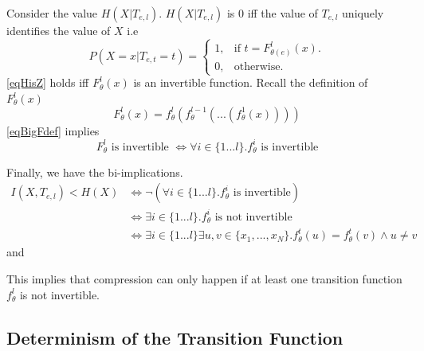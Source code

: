 \documentclass[dissertation.tex]{subfiles}
\begin{document}
Consider the value $H(X|T_{e,l})$. $H(X|T_{e,l})$ is 0 iff the value of
$T_{e,l}$ uniquely identifies the value of $X$ i.e
\begin{equation} 
  P(X=x|T_{e,t}=t) = \begin{cases}
    1, & \text{if } t = F_{\theta(e)}^l(x). \\
    0, & \text{otherwise}.
  \end{cases}
  \label{eqHisZ}
\end{equation}
\autoref{eqHisZ} holds iff $F_{\theta}^l(x)$ is an invertible function.
Recall the definition of $F_{\theta}^l(x)$
\begin{equation}
  F_{\theta}^l(x) = f_{\theta}^l(f_{\theta}^{l-1}(...(f_{\theta}^1(x))))
  \label{eqBigFdef}
\end{equation}
\autoref{eqBigFdef} implies 
\begin{equation*}
  F_\theta^l \text{ is invertible } 
  \Leftrightarrow 
  \forall{i}\in{\{1...l\}}. f_\theta^i \text{ is invertible} 
\end{equation*}

Finally, we have the bi-implications.
\begin{align}
  I(X, T_{e,l}) < H(X) 
  &\Leftrightarrow 
  \neg(\forall{i}\in{\{1...l\}}. f_\theta^i \text{ is invertible})
  \nonumber\\
  &\Leftrightarrow 
  \exists{i}\in{\{1...l\}}. f_\theta^i \text{ is not invertible} 
  \nonumber\\
  &\Leftrightarrow 
  \exists{i}\in{\{1...l\}}\exists{u,v}\in{\{x_1,...,x_N\}}.
  f_\theta^t(u)=f_\theta^t(v) \land u \neq v 
\end{align}
and 

This implies that compression can only happen if at least one transition
function $f_\theta^l$ is not invertible.

\subsection{Determinism of the Transition Function} \label{subDTF}
\end{document}
